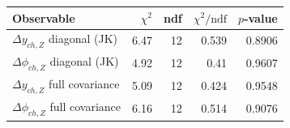 \begin{tabular}{|l|r|r|r|r|}
\hline
Observable & $\chi^2$ & ndf & $\chi^2/\mathrm{ndf}$ & $p$-value \\
\hline
$\Delta y_{ch,Z}$ diagonal (JK) & 6.47 & 12 & 0.539 & 0.8906 \\
$\Delta\phi_{ch,Z}$ diagonal (JK) & 4.92 & 12 & 0.41 & 0.9607 \\
$\Delta y_{ch,Z}$ full covariance & 5.09 & 12 & 0.424 & 0.9548 \\
$\Delta\phi_{ch,Z}$ full covariance & 6.16 & 12 & 0.514 & 0.9076 \\
\hline
\end{tabular}
